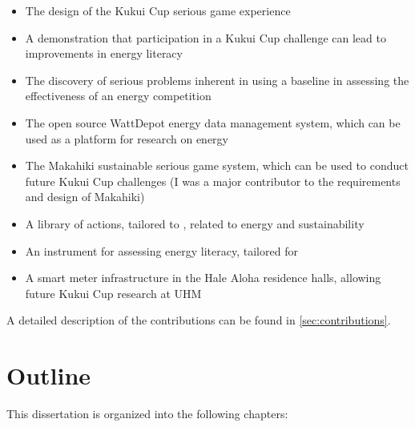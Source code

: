 \begin{itemize}
	\item The design of the Kukui Cup serious game experience 
	\item A demonstration that participation in a Kukui Cup challenge can lead to improvements in energy literacy
	\item The discovery of serious problems inherent in using a baseline in assessing the effectiveness of an energy competition
	\item The open source WattDepot energy data management system, which can be used as a platform for research on energy
	\item The Makahiki sustainable serious game system, which can be used to conduct future Kukui Cup challenges (I was a major contributor to the requirements and design of Makahiki)
	\item A library of actions, tailored to \Hawaii, related to energy and sustainability
	\item An instrument for assessing energy literacy, tailored for \Hawaii
	\item A smart meter infrastructure in the Hale Aloha residence halls, allowing future Kukui Cup research at UHM
\end{itemize}

A detailed description of the contributions can be found in \autoref{sec:contributions}.


\section{Outline}

This dissertation is organized into the following chapters:

